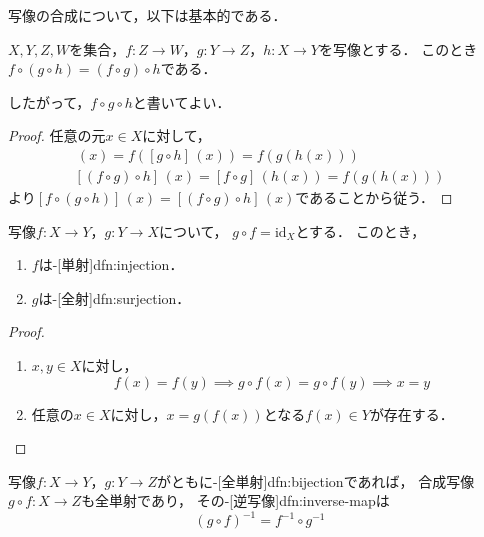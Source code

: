 \documentclass[../sotsu.tex]{subfiles}
\begin{document}
写像の合成について，以下は基本的である．

\begin{proposition}
    \label{thm:map-is-associative}
    $X, Y, Z, W$を集合，$f \colon Z \to W$，$g \colon Y \to Z$，$h \colon X \to Y$を写像とする．
    このとき$f \circ (g \circ h) = (f \circ g) \circ h$である．
\end{proposition}

したがって，$f \circ g \circ h$と書いてよい．


\begin{proof}
    任意の元$x \in X$に対して，
    \begin{gather*}
        [f \circ (g \circ h)] \, (x)
            = f([g \circ h] \, (x))
            = f(g(h(x)))
        \\
        [(f \circ g) \circ h] \, (x)
            = [f \circ g] \, (h(x))
            = f(g(h(x)))
    \end{gather*}
    より$[f \circ (g \circ h)] \, (x) = [(f \circ g) \circ h] \, (x)$であることから従う．
\end{proof}


\begin{proposition}
    \label{thm:f-composition-g-is-identity}
    写像$f \colon X \to Y$，$g \colon Y \to X$について，
    $g \circ f = \mathrm{id}_X$とする．
    このとき，
    \begin{enumerate}
        \item $f$は-[単射]{dfn:injection}．
        \item $g$は-[全射]{dfn:surjection}．
    \end{enumerate}
\end{proposition}

\begin{proof}
    \begin{enumerate}
        \item $x, y \in X$に対し，
            \[
                f(x) = f(y)
                \implies
                g \circ f(x) = g \circ f(y)
                \implies
                x = y
            \]
        \item 任意の$x \in X$に対し，$x = g(f(x))$となる$f(x) \in Y$が存在する．
        \qedhere
    \end{enumerate}
\end{proof}


\begin{proposition}
    \label{thm:inverse-map-of-composition}
    写像$f \colon X \to Y$，$g \colon Y \to Z$がともに-[全単射]{dfn:bijection}であれば，
    合成写像$g \circ f \colon X \to Z$も全単射であり，
    その-[逆写像]{dfn:inverse-map}は
    \[  (g \circ f)^{-1} = f^{-1} \circ g^{-1}  \]
\end{proposition}
\end{document}
